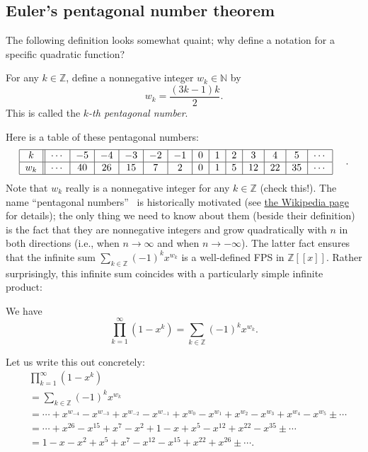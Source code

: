 \subsection{Euler's pentagonal number theorem}

The following definition looks somewhat quaint; why define a notation for a
specific quadratic function?

\begin{definition}
\label{def.pars.pent-num}For any $k\in\mathbb{Z}$, define a nonnegative
integer $w_{k}\in\mathbb{N}$ by%
\[
w_{k}=\dfrac{\left(  3k-1\right)  k}{2}.
\]
This is called the $k$\emph{-th pentagonal number}.
\end{definition}

Here is a table of these pentagonal numbers:%
\[%
\begin{tabular}
[c]{|c||c|c|c|c|c|c|c|c|c|c|c|c|c|}\hline
$k$ & $\cdots$ & $-5$ & $-4$ & $-3$ & $-2$ & $-1$ & $0$ & $1$ & $2$ & $3$ &
$4$ & $5$ & $\cdots$\\\hline
$w_{k}$ & $\cdots$ & $40$ & $26$ & $15$ & $7$ & $2$ & $0$ & $1$ & $5$ & $12$ &
$22$ & $35$ & $\cdots$\\\hline
\end{tabular}
\ \ \ \ .
\]
Note that $w_{k}$ really is a nonnegative integer for any $k\in\mathbb{Z}$
(check this!). The name \textquotedblleft pentagonal numbers\textquotedblright%
\ is historically motivated (see
\href{https://en.wikipedia.org/wiki/Pentagonal_number}{the Wikipedia page} for
details); the only thing we need to know about them (beside their definition)
is the fact that they are nonnegative integers and grow quadratically with $n$
in both directions (i.e., when $n\rightarrow\infty$ and when $n\rightarrow
-\infty$). The latter fact ensures that the infinite sum $\sum_{k\in
\mathbb{Z}}\left(  -1\right)  ^{k}x^{w_{k}}$ is a well-defined FPS in
$\mathbb{Z}\left[  \left[  x\right]  \right]  $. Rather surprisingly, this
infinite sum coincides with a particularly simple infinite product:

\begin{theorem}
\label{thm.pars.pent}We have%
\[
\prod_{k=1}^{\infty}\left(  1-x^{k}\right)  =\sum_{k\in\mathbb{Z}}\left(
-1\right)  ^{k}x^{w_{k}}.
\]

\end{theorem}

Let us write this out concretely:%
\begin{align*}
&  \prod_{k=1}^{\infty}\left(  1-x^{k}\right) \\
&  =\sum_{k\in\mathbb{Z}}\left(  -1\right)  ^{k}x^{w_{k}}\\
&  =\cdots+x^{w_{-4}}-x^{w_{-3}}+x^{w_{-2}}-x^{w_{-1}}+x^{w_{0}}-x^{w_{1}%
}+x^{w_{2}}-x^{w_{3}}+x^{w_{4}}-x^{w_{5}}\pm\cdots\\
&  =\cdots+x^{26}-x^{15}+x^{7}-x^{2}+1-x+x^{5}-x^{12}+x^{22}-x^{35}\pm\cdots\\
&  =1-x-x^{2}+x^{5}+x^{7}-x^{12}-x^{15}+x^{22}+x^{26}\pm\cdots.
\end{align*}


